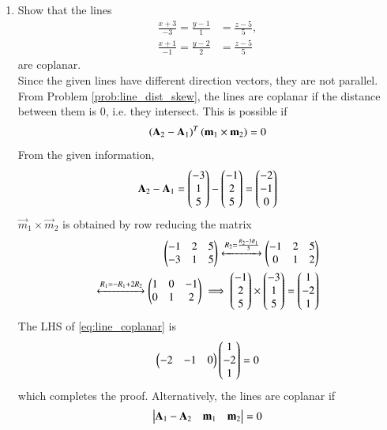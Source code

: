 \begin{enumerate}[label=\arabic*.,ref=\thesubsection.\theenumi]
\item Show that the lines 
\label{prob:line_coplanar}
%
\begin{align}
\frac{x+3}{-3} = \frac{y-1}{1} &= \frac{z-5}{5}, 
\\
\frac{x+1}{-1} = \frac{y-2}{2} &= \frac{z-5}{5} 
\end{align}
%
are coplanar.
\\
\solution Since the given lines have different direction vectors, they are not parallel.  From Problem \eqref{prob:line_dist_skew}, the lines are coplanar if the distance between them is 0, i.e. they intersect.  This is possible if 
%
\begin{align}
\label{eq:line_coplanar}
\left(\mathbf{A}_2-\mathbf{A}_1\right)^T\left(\mathbf{m}_1\times\mathbf{m}_2\right) = 0
\end{align}
%
From the given information, 
%
\begin{align}
\mathbf{A}_2-\mathbf{A}_1 = \begin{pmatrix}-3\\1\\5\end{pmatrix}-\begin{pmatrix}-1\\2\\5\end{pmatrix} = \begin{pmatrix}-2\\-1\\0\end{pmatrix}
\end{align}
%
$\vec{m}_1\times \vec{m}_2$ is obtained by row reducing the matrix
%
\begin{align}
\begin{pmatrix}
-1 & 2 & 5
\\
-3 & 1 & 5
\end{pmatrix}
\xleftrightarrow[]{R_2=\frac{R_2-3R_1}{5}}
\begin{pmatrix}
-1 & 2 & 5
\\
0 & 1 & 2
\end{pmatrix}
\\
\xleftrightarrow[]{R_1=-R_1+2R_2}
\begin{pmatrix}
1 & 0 & -1
\\
0 & 1 & 2
\end{pmatrix}
\implies \begin{pmatrix}-1 \\ 2 \\ 5\end{pmatrix}
\times \begin{pmatrix}-3 \\ 1 \\ 5\end{pmatrix}
=\begin{pmatrix}1\\-2\\1\end{pmatrix}
\end{align}
%
The LHS of \eqref{eq:line_coplanar} is 
\begin{align}
\begin{pmatrix}-2 & -1 & 0\end{pmatrix}
\begin{pmatrix}1\\-2\\1\end{pmatrix} = 0
\end{align}
%
which completes the proof.  Alternatively, the lines are coplanar if
%
\begin{align}
\begin{vmatrix}\mathbf{A}_1-\mathbf{A}_2 & \mathbf{m}_1 & \mathbf{m}_2\end{vmatrix} = 0
\end{align}
%


\end{enumerate}
